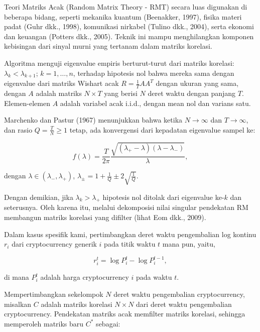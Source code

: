 \documentclass[12pt,a4paper]{article}
\begin{document}
Teori Matriks Acak (Random Matrix Theory - RMT) secara luas digunakan di beberapa bidang, seperti mekanika kuantum (Beenakker, 1997)\cite{beenakker1997}, fisika materi padat (Guhr dkk., 1998)\cite{guhr1998}, komunikasi nirkabel (Tulino dkk., 2004)\cite{tulino2004}, serta ekonomi dan keuangan (Potters dkk., 2005)\cite{potters2005}. Teknik ini mampu menghilangkan komponen kebisingan dari sinyal murni yang tertanam dalam matriks korelasi.

Algoritma menguji eigenvalue empiris berturut-turut dari matriks korelasi: $\lambda_k < \lambda_{k+1}$; $k = 1, \ldots, n$, terhadap hipotesis nol bahwa mereka sama dengan eigenvalue dari matriks Wishart acak $R = \frac{1}{T}AA^T$ dengan ukuran yang sama, dengan $A$ adalah matriks $N \times T$ yang berisi $N$ deret waktu dengan panjang $T$. Elemen-elemen $A$ adalah variabel acak i.i.d., dengan mean nol dan varians satu.

Marchenko dan Pastur (1967)\cite{marchenko1967} menunjukkan bahwa ketika $N \to \infty$ dan $T \to \infty$, dan rasio $Q = \frac{T}{N} \geq 1$ tetap, ada konvergensi dari kepadatan eigenvalue sampel ke:

\begin{equation}
f(\lambda) = \frac{T}{2\pi} \frac{\sqrt{(\lambda_+ - \lambda)(\lambda - \lambda_-)}}{\lambda},
\end{equation}

dengan $\lambda \in (\lambda_-, \lambda_+)$, $\lambda_{\pm} = 1 + \frac{1}{Q} \pm 2\sqrt{\frac{1}{Q}}$.

Dengan demikian, jika $\lambda_k > \lambda_+$ hipotesis nol ditolak dari eigenvalue ke-$k$ dan seterusnya. Oleh karena itu, melalui dekomposisi nilai singular pendekatan RM membangun matriks korelasi yang difilter (lihat Eom dkk., 2009)\cite{eom2009}.

Dalam kasus spesifik kami, pertimbangkan deret waktu pengembalian log kontinu $r_i$ dari cryptocurrency generik $i$ pada titik waktu $t$ mana pun, yaitu,

\begin{equation}
r_i^t = \log P_i^t - \log P_i^{t-1},
\end{equation}

di mana $P_i^t$ adalah harga cryptocurrency $i$ pada waktu $t$.

Mempertimbangkan sekelompok $N$ deret waktu pengembalian cryptocurrency, misalkan $C$ adalah matriks korelasi $N \times N$ dari deret waktu pengembalian cryptocurrency. Pendekatan matriks acak memfilter matriks korelasi, sehingga memperoleh matriks baru $C^*$ sebagai:
\end{document}
